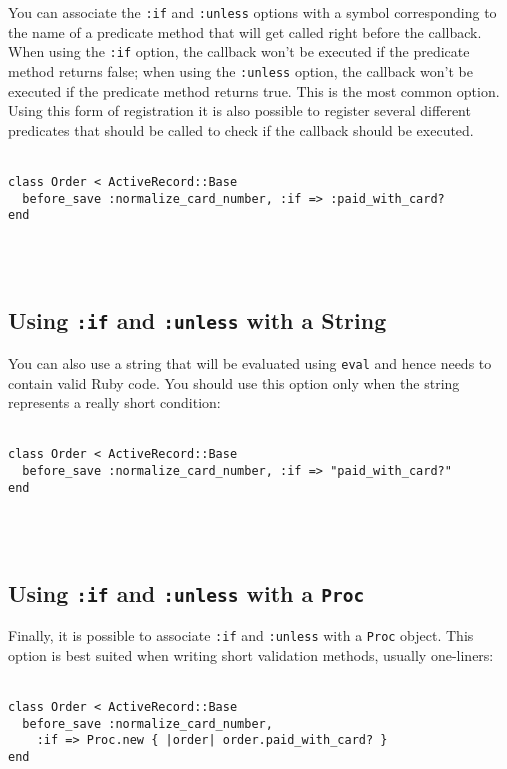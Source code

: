 \documentclass[10pt]{book}
\begin{document}
You can associate the \texttt{:if} and \texttt{:unless} options with a  symbol corresponding to the name of a predicate method that will get  called right before the callback. When using the \texttt{:if} option, the callback won’t be executed if the predicate method returns false; when using the \texttt{:unless}  option, the callback won’t be executed if the predicate method returns  true. This is the most common option. Using this form of registration it  is also possible to register several different predicates that should  be called to check if the callback should be executed.
\\ \\
\begin{minipage}{\textwidth}{\scriptsize
\begin{verbatim}
class Order < ActiveRecord::Base
  before_save :normalize_card_number, :if => :paid_with_card?
end
\end{verbatim}}
\end{minipage}
\\ \\

\subsection{ Using \texttt{:if} and \texttt{:unless} with a String}

You can also use a string that will be evaluated using \texttt{eval}  and hence needs to contain valid Ruby code. You should use this option  only when the string represents a really short condition:
\\ \\
\begin{minipage}{\textwidth}{\scriptsize
\begin{verbatim}
class Order < ActiveRecord::Base
  before_save :normalize_card_number, :if => "paid_with_card?"
end
\end{verbatim}}
\end{minipage}
\\ \\

\subsection{ Using \texttt{:if} and \texttt{:unless} with a \texttt{Proc}}

Finally, it is possible to associate \texttt{:if} and \texttt{:unless} with a \texttt{Proc} object. This option is best suited when writing short validation methods, usually one-liners:
\\ \\
\begin{minipage}{\textwidth}{\scriptsize
\begin{verbatim}
class Order < ActiveRecord::Base
  before_save :normalize_card_number,
    :if => Proc.new { |order| order.paid_with_card? }
end
\end{verbatim}}
\end{minipage}
\\ \\
\end{document}
